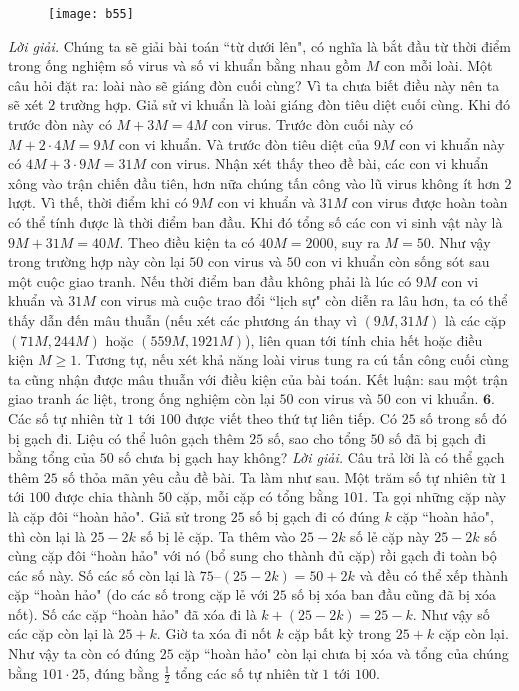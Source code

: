\begin{multicols}{2}
\begin{figure}[H]
	\texttt{[image: b55]}
	\vspace*{-10pt}
\end{figure}
\textit{Lời giải.} Chúng ta sẽ giải bài toán ``từ dưới lên", có nghĩa là bắt đầu từ thời điểm trong ống nghiệm số virus và số vi khuẩn bằng nhau gồm $M$ con mỗi loài. Một câu hỏi đặt ra: loài nào sẽ giáng đòn cuối cùng? Vì ta chưa biết điều này nên ta sẽ xét $2$ trường hợp.
\vskip 0.1cm
Giả sử vi khuẩn  là loài giáng đòn tiêu diệt cuối cùng. Khi đó trước đòn này có $M+3M=4M$ con virus. Trước đòn cuối này có $M+2\cdot 4M=9M$ con vi khuẩn. Và trước đòn tiêu diệt của $9M$ con vi khuẩn này có $4M+3\cdot9M= 31M$ con virus. Nhận xét thấy theo đề bài, các con vi khuẩn xông vào trận chiến đầu tiên, hơn nữa chúng tấn công vào lũ virus không ít hơn $2$ lượt. Vì thế,  thời điểm khi có $9M$ con vi khuẩn và $31M$ con virus được hoàn toàn có thể tính được là thời điểm ban đầu. Khi đó tổng số các con vi sinh vật này là $9M+31M=40M$. Theo điều kiện ta có $40M=2000$, suy ra $M=50$. Như vậy trong trường hợp này còn lại $50$ con virus và $50$ con vi khuẩn còn sống sót sau một cuộc giao tranh.
\vskip 0.1cm
Nếu thời điểm ban đầu không phải là lúc có $9M$ con vi khuẩn và $31M$ con virus mà cuộc trao đổi ``lịch sự" còn diễn ra lâu hơn, ta có thể thấy dẫn đến mâu thuẫn (nếu xét các phương án thay vì $(9M,31M)$ là các cặp $(71M,244M)$ hoặc $(559M,1921M)$), liên quan tới tính chia hết hoặc điều kiện $M \ge 1$. 
\vskip 0.1cm
Tương tự, nếu xét khả năng loài virus tung ra cú tấn công cuối cùng ta cũng nhận được mâu thuẫn với điều kiện của bài toán.
\vskip 0.1cm
Kết luận: sau một trận giao tranh ác liệt, trong ống nghiệm còn lại $50$ con virus và $50$ con vi khuẩn.
\vskip 0.1cm
$\pmb{6.}$ Các số tự nhiên từ $1$ tới $100$ được viết theo thứ tự liên tiếp. Có $25$ số trong số đó bị gạch đi. Liệu có thể luôn gạch thêm $25$ số, sao cho tổng $50$ số đã bị gạch đi bằng tổng của $50$ số chưa bị gạch hay không?
\vskip 0.1cm
\textit{Lời giải.} Câu trả lời là có thể gạch thêm $25$ số thỏa mãn yêu cầu đề bài. Ta làm như sau.
\vskip 0.1cm
Một trăm số tự nhiên từ $1$ tới $100$ được chia thành $50$ cặp, mỗi cặp có tổng bằng $101$. Ta gọi những cặp này là cặp đôi ``hoàn hảo". Giả sử trong $25$ số bị gạch đi có đúng $k$ cặp ``hoàn hảo", thì còn lại là $25-2k$ số bị lẻ cặp. Ta thêm vào $25-2k$ số lẻ cặp này $25-2k$ số cùng cặp đôi ``hoàn hảo" với nó (bổ sung cho thành đủ cặp) rồi gạch đi toàn bộ các số này. Số các số còn lại là $75 – (25-2k)=50+2k$ và đều có thể xếp thành cặp ``hoàn hảo" (do các số trong cặp lẻ với $25$ số bị xóa ban đầu cũng đã bị xóa nốt). Số các cặp ``hoàn hảo" đã xóa đi là $k+(25-2k)=25-k$. Như vậy số các cặp còn lại là $25+k$. Giờ ta xóa đi nốt $k$ cặp bất kỳ trong $25+k$ cặp còn lại. Như vậy ta còn có đúng $25$ cặp ``hoàn hảo" còn lại chưa bị xóa và  tổng của chúng bằng $ 101 \cdot 25$, đúng bằng $\frac{1}{2}$ tổng các số tự nhiên từ $1$ tới $100$.
\end{multicols}
